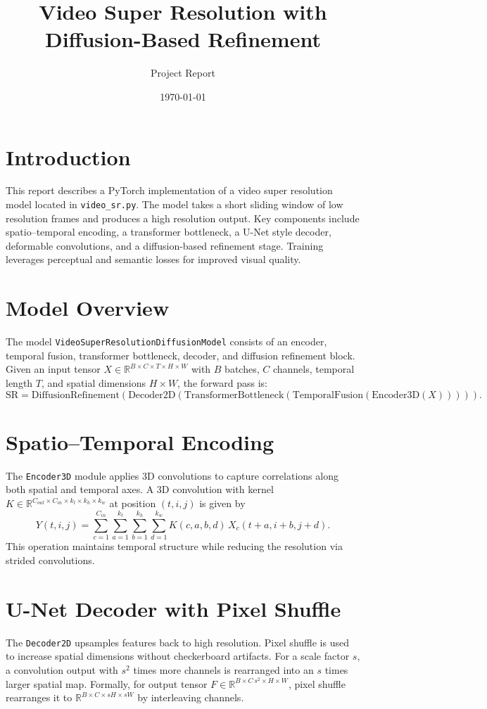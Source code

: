 \documentclass{article}
\title{Video Super Resolution with Diffusion-Based Refinement}
\author{Project Report}
\date{\today}
\begin{document}
\maketitle
\section{Introduction}
This report describes a PyTorch implementation of a video super resolution model located in \texttt{video\_sr.py}. The model takes a short sliding window of low resolution frames and produces a high resolution output. Key components include spatio--temporal encoding, a transformer bottleneck, a U-Net style decoder, deformable convolutions, and a diffusion-based refinement stage. Training leverages perceptual and semantic losses for improved visual quality.
\section{Model Overview}
The model \texttt{VideoSuperResolutionDiffusionModel} consists of an encoder, temporal fusion, transformer bottleneck, decoder, and diffusion refinement block. Given an input tensor $X \in \mathbb{R}^{B\times C\times T\times H\times W}$ with $B$ batches, $C$ channels, temporal length $T$, and spatial dimensions $H\times W$, the forward pass is:
\begin{equation}
\mathrm{SR} = \mathrm{DiffusionRefinement}(\mathrm{Decoder2D}(\mathrm{TransformerBottleneck}(\mathrm{TemporalFusion}(\mathrm{Encoder3D}(X))))).
\end{equation}
\section{Spatio--Temporal Encoding}
The \texttt{Encoder3D} module applies 3D convolutions to capture correlations along both spatial and temporal axes. A 3D convolution with kernel $K \in \mathbb{R}^{C_{out}\times C_{in}\times k_t\times k_h\times k_w}$ at position $(t,i,j)$ is given by
\begin{equation}
Y(t,i,j) = \sum_{c=1}^{C_{in}}\sum_{a=1}^{k_t}\sum_{b=1}^{k_h}\sum_{d=1}^{k_w} K(c,a,b,d)\, X_{c}(t+a,i+b,j+d).
\end{equation}
This operation maintains temporal structure while reducing the resolution via strided convolutions.
\section{U-Net Decoder with Pixel Shuffle}
The \texttt{Decoder2D} upsamples features back to high resolution. Pixel shuffle is used to increase spatial dimensions without checkerboard artifacts. For a scale factor $s$, a convolution output with $s^2$ times more channels is rearranged into an $s$ times larger spatial map. Formally, for output tensor $F \in \mathbb{R}^{B\times C\,s^{2}\times H\times W}$, pixel shuffle rearranges it to $\mathbb{R}^{B\times C\times sH\times sW}$ by interleaving channels.
\end{document}
